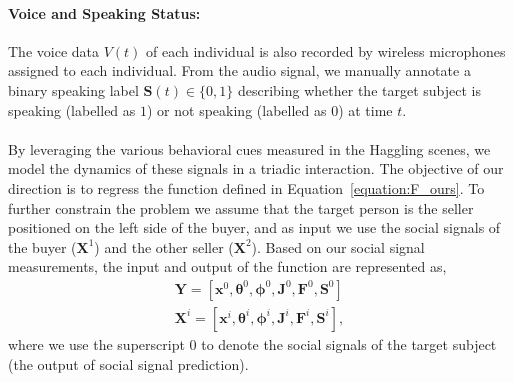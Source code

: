 \paragraph{Voice and Speaking Status:} The voice data $V(t)$ of each individual is also recorded by wireless microphones assigned to each individual. From the audio signal, we manually annotate a binary speaking label $\mathbf{S}(t) \in \{0,1\}$ describing whether the target subject is speaking (labelled as $1$) or not speaking (labelled as $0$) at time $t$.\\%
\mbox{ }\\
By leveraging the various behavioral cues measured in the Haggling scenes, we model the dynamics of these signals in a triadic interaction. The objective of our direction is to regress the function defined in Equation~\ref{equation:F_ours}. To further constrain the problem we assume that the target person is the seller positioned on the left side of the buyer, and as input we use the social signals of the buyer ($\mathbf{X}^1$) and the other seller ($\mathbf{X}^2$). Based on our social signal measurements, the input and output of the function are represented as,
\begin{equation}
\begin{gathered}
\mathbf{Y} = [ \mathbf{x}^0, \boldsymbol{\theta}^0, \boldsymbol{\phi}^0, \mathbf{J}^0, \mathbf{F}^0, \mathbf{S}^0 ]\\
\mathbf{X}^i = [ \mathbf{x}^i, \boldsymbol{\theta}^i, \boldsymbol{\phi}^i, \mathbf{J}^i, \mathbf{F}^i, \mathbf{S}^i ],
\end{gathered}
\end{equation}
where we use the superscript 0 to denote the social signals of the target subject (the output of social signal prediction). 


